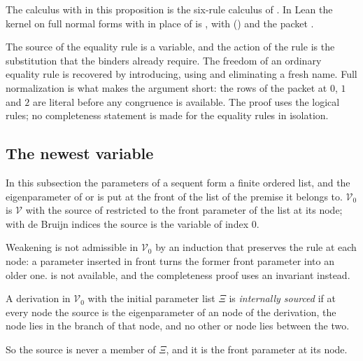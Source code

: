 The calculus with  in this proposition is the six-rule
calculus of . In Lean the kernel on full normal
forms with  in place of  is , with
 () and the packet
.

\begin{remark}
The source of the equality rule is a variable, and the action of the rule
is the substitution that the binders already require. The freedom of an
ordinary equality rule is recovered by introducing, using and eliminating
a fresh name. Full normalization is what makes the argument short: the
rows of the packet at $0$, $1$ and $2$ are literal before any congruence
is available. The proof uses the logical rules; no completeness statement
is made for the equality rules in isolation.
\end{remark}

\subsection{The newest variable}
\label{disch:sec:newest}

In this subsection the parameters of a sequent form a finite ordered list,
and the eigenparameter of  or  is put at
the front of the list of the premise it belongs to. $\mathcal V_0$ is
$\mathcal V$ with the source of  restricted to the front
parameter of the list at its node; with de Bruijn indices the source is
the variable of index $0$.

Weakening is not admissible in $\mathcal V_0$ by an induction that
preserves the rule at each node: a parameter inserted in front turns the
former front parameter into an older one.  is
not available, and the completeness proof uses an invariant instead.

\begin{definition}
\label{disch:def:internal}
A derivation in $\mathcal V_0$ with the initial parameter list $\Xi$ is
\emph{internally sourced} if at every  node the source is
the eigenparameter of an  node of the derivation, the
 node lies in the branch of that node, and no other
 or  node lies between the two.
\end{definition}

So the source is never a member of $\Xi$, and it is the front parameter at
its node.

